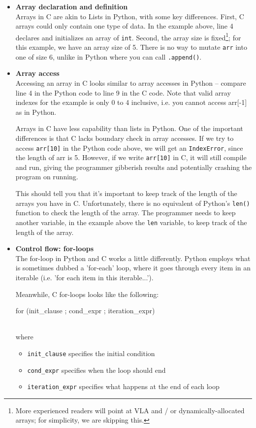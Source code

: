 \begin{itemize}
    \item \textbf{Array declaration and definition} \\
    Arrays in C are akin to Lists in Python, with some key differences. First, C arrays could only contain one type of data. In the example above, line 4 declares and initializes an array of \verb|int|. Second, the array size is fixed\footnote{More experienced readers will point at VLA and / or dynamically-allocated arrays; for simplicity, we are skipping this.}; for this example, we have an array size of 5. There is no way to mutate \verb|arr| into one of size 6, unlike in Python where you can call \verb|.append()|.  

    \item \textbf{Array access} \\
    Accessing an array in C looks similar to array accesses in Python -- compare line 4 in the Python code to line 9 in the C code. Note that valid array indexes for the example is only 0 to 4 inclusive, i.e. you cannot access arr[-1] as in Python.
    
    Arrays in C have less capability than lists in Python. One of the important differences is that C lacks boundary check in array accesses. If we try to access \verb|arr[10]| in the Python code above, we will get an \verb|IndexError|, since the length of arr is 5. However, if we write \verb|arr[10]| in C, it will still compile and run, giving the programmer gibberish results and potentially crashing the program on running. 
    
    This should tell you that it's important to keep track of the length of the arrays you have in C. Unfortunately, there is no equivalent of Python's \verb|len()| function to check the length of the array. The programmer needs to keep another variable, in the example above the \verb|len| variable, to keep track of the length of the array.


    \item \textbf{Control flow: for-loops} \\
    The for-loop in Python and C works a little differently. Python employs what is sometimes dubbed a 'for-each' loop, where it goes through every item in an iterable (i.e. 'for each item in this iterable...').

    Meanwhile, C for-loops looks like the following: \\
    \begin{typewriter}
        for (init\_clause ; cond\_expr ; iteration\_expr)
    \end{typewriter} \\
    where 
    \begin{itemize}
    \item \verb|init_clause| specifies the initial condition
    \item \verb|cond_expr| specifies when the loop should end
    \item \verb|iteration_expr| specifies what happens at the end of each loop
    \end{itemize}  
    

\end{itemize}
